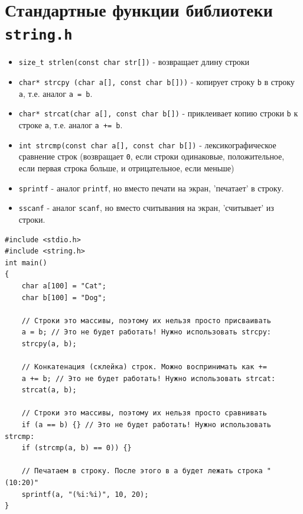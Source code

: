 \documentclass[10pt]{article}
\begin{document}
\section*{Стандартные функции библиотеки \texttt{string.h}}
\begin{itemize}
\item \texttt{size\_t strlen(const char str[])} - возвращает длину строки
\item \texttt{char* strcpy (char a[], const char b[]))} - копирует строку \texttt{b} в строку \texttt{a}, т.е. аналог \texttt{a = b}.
\item \texttt{char* strcat(char a[], const char b[])} - приклеивает копию строки \texttt{b} к строке \texttt{a}, т.е. аналог \texttt{a += b}.
\item \texttt{int strcmp(const char a[], const char b[])} - лексикографическое сравнение строк (возвращает \texttt{0}, если строки одинаковые, положительное, если первая строка больше, и отрицательное, если меньше)
\item \texttt{sprintf} - аналог \texttt{printf}, но вместо печати на экран, 'печатает' в строку.
\item \texttt{sscanf} - аналог \texttt{scanf}, но вместо считывания на экран, 'считывает' из строки.
\end{itemize}
\begin{lstlisting}
#include <stdio.h>
#include <string.h>
int main() 
{
    char a[100] = "Cat";
    char b[100] = "Dog";
	
    // Строки это массивы, поэтому их нельзя просто присваивать 
    a = b; // Это не будет работать! Нужно использовать strcpy:
    strcpy(a, b);
    
    // Конкатенация (склейка) строк. Можно воспринимать как +=
    a += b; // Это не будет работать! Нужно использовать strcat:
    strcat(a, b);
	
    // Строки это массивы, поэтому их нельзя просто сравнивать
    if (a == b) {} // Это не будет работать! Нужно использовать strcmp:
    if (strcmp(a, b) == 0)) {} 
    
    // Печатаем в строку. После этого в a будет лежать строка "(10:20)"
    sprintf(a, "(%i:%i)", 10, 20);
}
\end{lstlisting}


\clearpage
\end{document}
